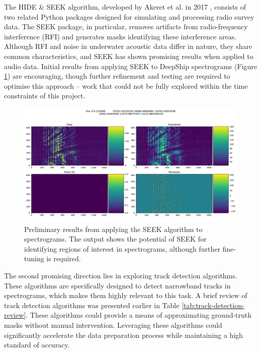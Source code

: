 The HIDE \& SEEK algorithm, developed by Akeret et al. in 2017 \cite{akeret_hide_2017}, consists of two related Python packages designed for simulating and processing radio survey data. The SEEK package, in particular, removes artifacts from radio-frequency interference (RFI) and generates masks identifying these interference areas. Although RFI and noise in underwater acoustic data differ in nature, they share common characteristics, and SEEK has shown promising results when applied to audio data. Initial results from applying SEEK to DeepShip spectrograms (Figure \ref{fig:seek-output}) are encouraging, though further refinement and testing are required to optimise this approach -- work that could not be fully explored within the time constraints of this project.

\begin{figure}[htbp]
    \centering
    \includegraphics[trim={0 0 0 2cm},clip,width=\linewidth]{img/ch6/masking/seek_output.pdf}
    \caption{Preliminary results from applying the SEEK algorithm to spectrograms. The output shows the potential of SEEK for identifying regions of interest in spectrograms, although further fine-tuning is required.}
    \label{fig:seek-output}
\end{figure}

The second promising direction lies in exploring track detection algorithms. These algorithms are specifically designed to detect narrowband tracks in spectrograms, which makes them highly relevant to this task. A brief review of track detection algorithms was presented earlier in Table \ref{tab:track-detection-review}. These algorithms could provide a means of approximating ground-truth masks without manual intervention. Leveraging these algorithms could significantly accelerate the data preparation process while maintaining a high standard of accuracy.

